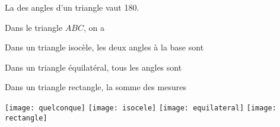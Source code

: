 \begin{myprop}
	La \hspace*{5cm} des angles d'un triangle vaut 180\degree.
\end{myprop}


\begin{myexs}
	\begin{multicols}{2}
		\vspace*{1cm}
			Dans le triangle $ABC$, on a \\ %
		\vspace*{1cm}
		
		
			Dans un triangle isocèle, les deux angles à la base sont %
			\vspace*{2.5cm}
		
		
			Dans un triangle équilatéral, tous les angles sont %
			
			\vspace*{2.5cm}
			
			Dans un triangle rectangle, la somme des mesures %
			
		\begin{center}	
		\texttt{[image: quelconque]}	
		\texttt{[image: isocele]}	
		\texttt{[image: equilateral]}
		\texttt{[image: rectangle]}
		\end{center}
	\end{multicols}
\end{myexs}